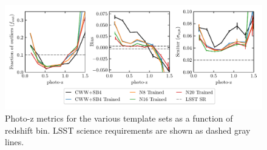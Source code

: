 \begin{figure}
    \centering
    \includegraphics{photoz_binned_metrics.pdf}
    \caption{Photo-z metrics for the various template sets as a function of redshift bin. LSST science requirements are shown as dashed gray lines.}
    \label{fig:photoz_binned}
\end{figure}